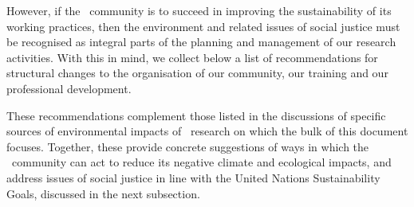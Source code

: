 \documentclass[../SustainableHEP.tex]{subfiles}
\begin{document}
However, if the \ACR\ community is to succeed in improving the sustainability of its working practices, then the environment and related issues of social justice must be recognised as integral parts of the planning and management of our research activities. With this in mind, we collect below a list of recommendations for structural changes to the organisation of our community, our training and our professional development.

These recommendations complement those listed in the discussions of specific sources of environmental impacts of \ACR\ research on which the bulk of this document focuses. Together, these provide concrete suggestions of ways in which the \ACR\ community can act to reduce its negative climate and ecological impacts, and address issues of social justice in line with the United Nations Sustainability Goals, discussed in the next subsection.

\end{document}
